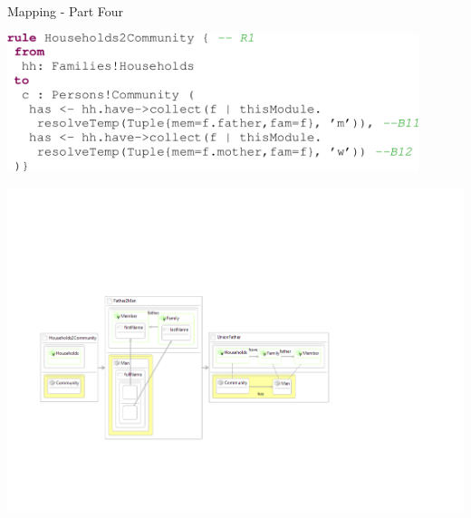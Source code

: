 \documentclass[xcolor=dvipsnames, 12pt]{beamer}
\begin{document}
\begin{frame}{Mapping - Part Four}
\begin{center}
\includegraphics[width=0.9\textwidth]{figures/ATL_collect}
\end{center}
\begin{center}
\includegraphics[width=\textwidth]{figures/Rules}
\end{center}
\end{frame}

\end{document}
